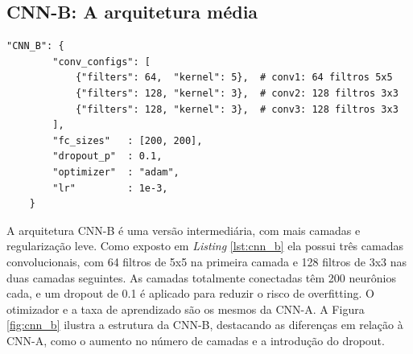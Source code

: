 \documentclass[a4paper,12pt]{article}
\begin{document}
\subsection{CNN-B: A arquitetura média}

\begin{lstlisting}[style=python, caption={Arquitetura B (CNN média).}, label={lst:cnn_b}]
"CNN_B": {
        "conv_configs": [
            {"filters": 64,  "kernel": 5},  # conv1: 64 filtros 5x5
            {"filters": 128, "kernel": 3},  # conv2: 128 filtros 3x3
            {"filters": 128, "kernel": 3},  # conv3: 128 filtros 3x3
        ],
        "fc_sizes"   : [200, 200],
        "dropout_p"  : 0.1,
        "optimizer"  : "adam",
        "lr"         : 1e-3,
    }
\end{lstlisting}

A arquitetura CNN-B é uma versão intermediária, com mais camadas e regularização leve. Como exposto em \textit{Listing} \ref{lst:cnn_b} ela possui três camadas convolucionais, com 64 filtros de 5x5 na primeira camada e 128 filtros de 3x3 nas duas camadas seguintes. As camadas totalmente conectadas têm 200 neurônios cada, e um dropout de 0.1 é aplicado para reduzir o risco de overfitting. O otimizador e a taxa de aprendizado são os mesmos da CNN-A.
A Figura \ref{fig:cnn_b} ilustra a estrutura da CNN-B, destacando as diferenças em relação à CNN-A, como o aumento no número de camadas e a introdução do dropout.
\end{document}
